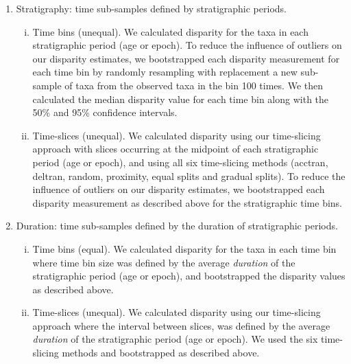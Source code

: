 \documentclass[12pt,a4paper]{article}
\begin{document}
\begin{enumerate}
  \item Stratigraphy: time sub-samples defined by stratigraphic periods. 
  \begin{enumerate}[(i)]
    \item Time bins (unequal). 
    We calculated disparity for the taxa in each stratigraphic period (age or epoch). 
    To reduce the influence of outliers on our disparity estimates, we bootstrapped each disparity measurement for each time bin by randomly resampling with replacement a new sub-sample of taxa from the observed taxa in the bin 100 times.
    We then calculated the median disparity value for each time bin along with the 50\% and 95\% confidence intervals.
    \item Time-slices (unequal).
    We calculated disparity using our time-slicing approach with slices occurring at the midpoint of each stratigraphic period (age or epoch), and using all six time-slicing methods (acctran, deltran, random, proximity, equal splits and gradual splits).
    To reduce the influence of outliers on our disparity estimates, we bootstrapped each disparity measurement as described above for the stratigraphic time bins.
    \end{enumerate}

  \item Duration: time sub-samples defined by the duration of stratigraphic periods. 
  \begin{enumerate}[(i)]
    \item Time bins (equal). 
    We calculated disparity for the taxa in each time bin where time bin size was defined by the average \textit{duration} of the stratigraphic period (age or epoch), and bootstrapped the disparity values as described above.
    \item Time-slices (unequal).
    We calculated disparity using our time-slicing approach where the interval between slices, was defined by the average \textit{duration} of the stratigraphic period (age or epoch).
    We used the six time-slicing methods and bootstrapped as described above.
  \end{enumerate}


\end{enumerate}
\end{document}
